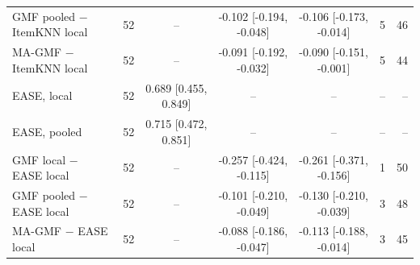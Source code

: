 \begin{table}[t]
\begin{tabular}{lrcccrr}
GMF pooled $-$ ItemKNN local & 52 & -- & -0.102 [-0.194, -0.048] & -0.106 [-0.173, -0.014] & 5 & 46 \\
MA-GMF $-$ ItemKNN local & 52 & -- & -0.091 [-0.192, -0.032] & -0.090 [-0.151, -0.001] & 5 & 44 \\
EASE, local & 52 & 0.689 [0.455, 0.849] & -- & -- & -- & -- \\
EASE, pooled & 52 & 0.715 [0.472, 0.851] & -- & -- & -- & -- \\
GMF local $-$ EASE local & 52 & -- & -0.257 [-0.424, -0.115] & -0.261 [-0.371, -0.156] & 1 & 50 \\
GMF pooled $-$ EASE local & 52 & -- & -0.101 [-0.210, -0.049] & -0.130 [-0.210, -0.039] & 3 & 48 \\
MA-GMF $-$ EASE local & 52 & -- & -0.088 [-0.186, -0.047] & -0.113 [-0.188, -0.014] & 3 & 45 \\
\bottomrule
\end{tabular}
\end{table}
